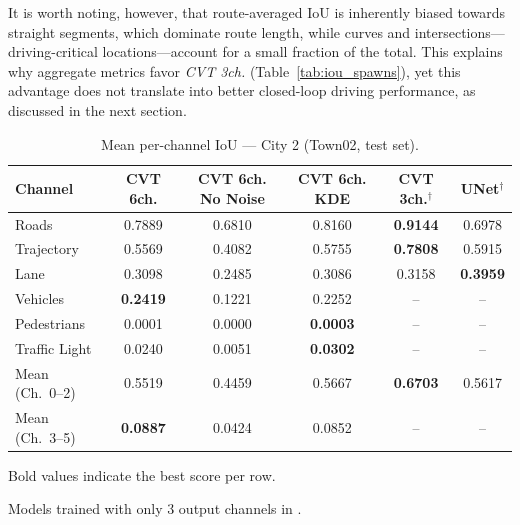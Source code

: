\documentclass[12pt]{article}
\begin{document}
It is worth noting, however, that route-averaged IoU is inherently biased towards straight segments, which dominate route length, while curves and intersections—driving-critical locations—account for a small fraction of the total. This explains why aggregate metrics favor \textit{CVT 3ch.} (Table~\ref{tab:iou_spawns}), yet this advantage does not translate into better closed-loop driving performance, as discussed in the next section.

\begin{table}[ht]
\centering
\caption{Mean per-channel IoU — City 2 (Town02, test set).}
\label{tab:iou_test_town02}
\begin{threeparttable}
\begin{tabular}{lccc|cc}
\toprule
\textbf{Channel}
  & \textbf{CVT 6ch.}
  & \textbf{CVT 6ch. No Noise}
  & \textbf{CVT 6ch. KDE}
  & \textbf{CVT 3ch.}$^{\dagger}$
  & \textbf{UNet}$^{\dagger}$ \\
\midrule
Roads          & 0.7889 & 0.6810 & 0.8160 & \textbf{0.9144} & 0.6978 \\
Trajectory     & 0.5569 & 0.4082 & 0.5755 & \textbf{0.7808} & 0.5915 \\
Lane           & 0.3098 & 0.2485 & 0.3086 & 0.3158          & \textbf{0.3959} \\
Vehicles       & \textbf{0.2419} & 0.1221 & 0.2252 & --     & --     \\
Pedestrians    & 0.0001 & 0.0000 & \textbf{0.0003} & --     & --     \\
Traffic Light  & 0.0240 & 0.0051 & \textbf{0.0302} & --     & --     \\
\midrule
Mean (Ch.\ 0--2) & 0.5519 & 0.4459 & 0.5667 & \textbf{0.6703} & 0.5617 \\
Mean (Ch.\ 3--5) & \textbf{0.0887} & 0.0424 & 0.0852 & --     & --     \\
\bottomrule
\end{tabular}
\begin{tablenotes}
\small
\item Bold values indicate the best score per row.
\item[$\dagger$] Models trained with only 3 output channels in \cite{santos2025initial}.
\end{tablenotes}
\end{threeparttable}
\end{table}




\end{document}
